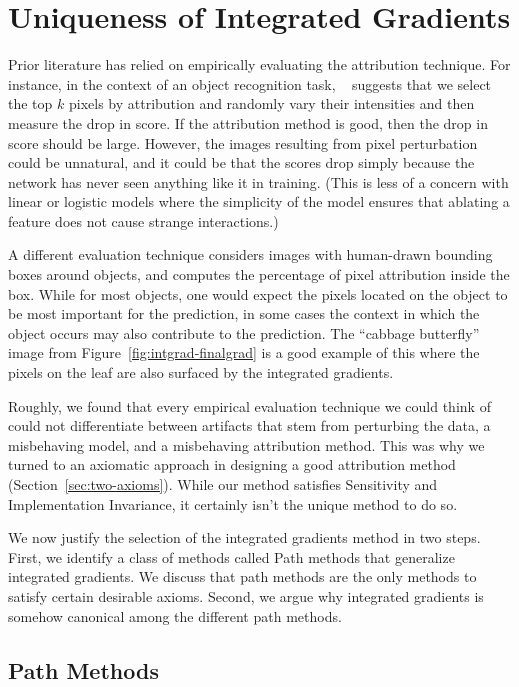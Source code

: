 \section{Uniqueness of Integrated Gradients}\label{sec:uniqueness}

Prior literature has relied on empirically evaluating the attribution
technique.  For instance, in the context of an object recognition
task, ~\cite{SBMBM15} suggests that we select the top $k$ pixels by
attribution and randomly vary their intensities and then measure the
drop in score. If the attribution method is good, then the drop in
score should be large. However, the images resulting from pixel
perturbation could be unnatural, and it could be that the scores drop
simply because the network has never seen anything like it in
training.  (This is less of a concern with linear or logistic
models where the simplicity of the model ensures that ablating a
feature does not cause strange interactions.)

\newpage

A different evaluation technique considers images with human-drawn
bounding boxes around objects, and computes the percentage of pixel
attribution inside the box. While for most objects, one would
expect the pixels located on the object to be most important for the
prediction, in some cases the context in which the object occurs may
also contribute to the prediction. The “cabbage butterfly” image from
Figure~\ref{fig:intgrad-finalgrad} is a good example of this where the
pixels on the leaf are also surfaced by the integrated gradients.


Roughly, we found that every empirical evaluation technique we could
think of could not differentiate between artifacts that stem from
perturbing the data, a misbehaving model, and a misbehaving
attribution method.  This was why we turned to an axiomatic approach
in designing a good attribution method (Section~\ref{sec:two-axioms}).
While our method satisfies Sensitivity and Implementation Invariance,
it certainly isn't the unique method to do so.


We now justify the selection of the integrated gradients method in two
steps.  First, we identify a class of methods called Path methods that
generalize integrated gradients.  We discuss that path methods are the
only methods to satisfy certain desirable axioms.  Second, we argue
why integrated gradients is somehow canonical among the different path
methods.

\subsection{Path Methods}
\label{sec:path_methods}

